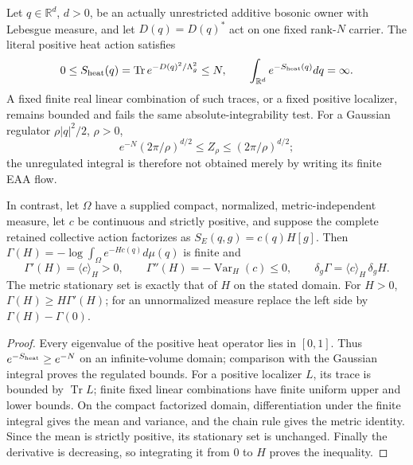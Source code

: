 \documentclass[12pt,a4paper]{article}
\begin{document}
\begin{proposition}
\label{p4:prop:v2216-finite-heat-integrability}
Let $q\in\mathbb R^d$, $d>0$, be an actually unrestricted additive
bosonic owner with Lebesgue measure, and let $D(q)=D(q)^*$ act on one
fixed rank-$N$ carrier. The literal positive heat action satisfies
\[
 0\le S_{\rm heat}(q)=\operatorname{Tr}e^{-D(q)^2/\Lambda_g^2}\le N,
 \qquad \int_{\mathbb R^d}e^{-S_{\rm heat}(q)}dq=\infty.
\]
A fixed finite real linear combination of such traces, or a fixed positive
localizer, remains bounded and fails the same absolute-integrability test.
For a Gaussian regulator $\rho|q|^2/2$, $\rho>0$,
\[
 e^{-N}(2\pi/\rho)^{d/2}\le Z_\rho\le(2\pi/\rho)^{d/2};
\]
the unregulated integral is therefore not obtained merely by writing its
finite EAA flow.

In contrast, let $\Omega$ have a supplied compact, normalized,
metric-independent measure, let $c$ be continuous and strictly positive,
and suppose the complete
retained collective action factorizes as $S_E(q,g)=c(q)H[g]$.
Then $\Gamma(H)=-\log\int_\Omega e^{-Hc(q)}d\mu(q)$ is finite and
\[
 \Gamma'(H)=\langle c\rangle_H>0,\qquad
 \Gamma''(H)=-\operatorname{Var}_H(c)\le0,\qquad
 \boxed{\delta_g\Gamma=\langle c\rangle_H\,\delta_gH.}
\]
The metric stationary set is exactly that of $H$ on the stated domain.
For $H>0$, $\Gamma(H)\ge H\Gamma'(H)$; for an unnormalized measure
replace the left side by $\Gamma(H)-\Gamma(0)$.
\end{proposition}
\begin{proof}
Every eigenvalue of the positive heat operator lies in $[0,1]$.
Thus $e^{-S_{\rm heat}}\ge e^{-N}$ on an infinite-volume domain;
comparison with the Gaussian integral proves the regulated bounds.
For a positive localizer $L$, its trace is bounded by
$\operatorname{Tr}L$; finite fixed linear combinations have finite
uniform upper and lower bounds. On the compact factorized domain,
differentiation under the finite integral gives the mean and variance,
and the chain rule gives the metric identity. Since the mean is strictly
positive, its stationary set is unchanged. Finally the derivative is
decreasing, so integrating it from $0$ to $H$ proves the inequality.
\end{proof}
\end{document}
